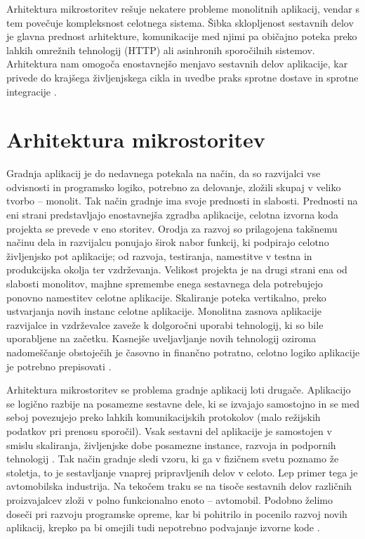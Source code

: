 \documentclass[a4paper, 12pt]{book}
\begin{document}
Arhitektura mikrostoritev rešuje nekatere probleme monolitnih aplikacij, vendar s tem povečuje kompleksnost celotnega sistema.
Šibka sklopljenost sestavnih delov je glavna prednost arhitekture, komunikacije med njimi pa običajno poteka preko lahkih omrežnih tehnologij (HTTP) ali asinhronih sporočilnih sistemov.
Arhitektura nam omogoča enostavnejšo menjavo sestavnih delov aplikacije, kar privede do krajšega življenjskega cikla in uvedbe praks sprotne dostave in sprotne integracije \cite{monolithMicroservice}.


\section{Arhitektura mikrostoritev}

Gradnja aplikacij je do nedavnega potekala na način, da so razvijalci vse odvisnosti in programsko logiko, potrebno za delovanje, zložili skupaj v veliko tvorbo -- monolit.
Tak način gradnje ima svoje prednosti in slabosti.
Prednosti na eni strani predstavljajo enostavnejša zgradba aplikacije, celotna izvorna koda projekta se prevede v eno storitev.
Orodja za razvoj so prilagojena takšnemu načinu dela in razvijalcu ponujajo širok nabor funkcij, ki podpirajo celotno življenjsko pot aplikacije; od razvoja, testiranja, namestitve v testna in produkcijska okolja ter vzdrževanja.
Velikost projekta je na drugi strani ena od slabosti monolitov, majhne spremembe enega sestavnega dela potrebujejo ponovno namestitev celotne aplikacije.
Skaliranje poteka vertikalno, preko ustvarjanja novih instanc celotne aplikacije.
Monolitna zasnova aplikacije razvijalce in vzdrževalce zaveže k dolgoročni uporabi tehnologij, ki so bile uporabljene na začetku.
Kasnejše uveljavljanje novih tehnologij oziroma nadomeščanje obstoječih je časovno in finančno potratno, celotno logiko aplikacije je potrebno prepisovati \cite{monolithMicroservice}.

Arhitektura mikrostoritev se problema gradnje aplikacij loti drugače.
Aplikacijo se logično razbije na posamezne sestavne dele, ki se izvajajo samostojno in se med seboj povezujejo preko lahkih komunikacijskih protokolov (malo režijskih podatkov pri prenosu sporočil).
Vsak sestavni del aplikacije je samostojen v smislu skaliranja, življenjske dobe posamezne instance, razvoja in podpornih tehnologij \cite{7030212}.
Tak način gradnje sledi vzoru, ki ga v fizičnem svetu poznamo že stoletja, to je sestavljanje vnaprej pripravljenih delov v celoto.
Lep primer tega je avtomobilska industrija.
Na tekočem traku se na tisoče sestavnih delov različnih proizvajalcev zloži v polno funkcionalno enoto -- avtomobil.
Podobno želimo doseči pri razvoju programske opreme, kar bi pohitrilo in pocenilo razvoj novih aplikacij, krepko pa bi omejili tudi nepotrebno podvajanje izvorne kode \cite{microservicePattern, microservicesMartin}.
\end{document}
